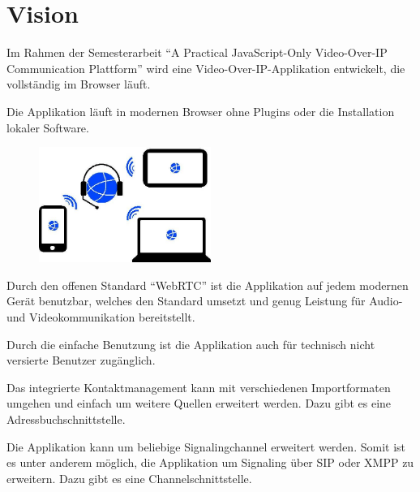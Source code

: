 \chapter{Vision}
	Im Rahmen der Semesterarbeit "`A Practical JavaScript-Only Video-Over-IP Communication Plattform"' wird eine
	Video-Over-IP-Applikation entwickelt, die vollständig im Browser läuft.
	
	Die Applikation läuft in modernen Browser ohne Plugins oder die Installation lokaler Software.
			
	\begin{figure}[H]
		\centering
		\includegraphics[width=0.5\textwidth]{../projektdokumentation/img/plattformUnabhaengigkeit.jpg}
		\label{plattformUnabhaengigkeit}
	\end{figure}
	
	Durch den offenen Standard "`WebRTC"' ist die Applikation auf jedem modernen
	Gerät benutzbar, welches den Standard umsetzt und genug Leistung für Audio- und
	Videokommunikation bereitstellt.
	
	Durch die einfache Benutzung ist die Applikation auch für technisch nicht
	versierte Benutzer zugänglich.
	
	Das integrierte Kontaktmanagement kann mit verschiedenen Importformaten umgehen und einfach um weitere Quellen erweitert werden. Dazu gibt es eine Adressbuchschnittstelle.
	
	Die Applikation kann um beliebige Signalingchannel erweitert werden. Somit ist
	es unter anderem möglich, die Applikation um Signaling über SIP oder XMPP zu
	erweitern. Dazu gibt es eine Channelschnittstelle.
	
	
